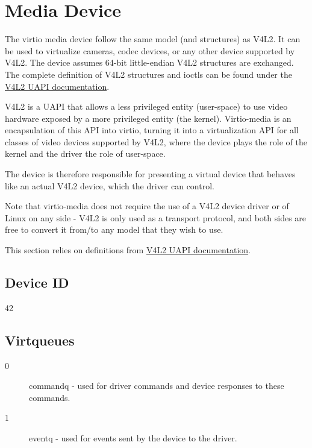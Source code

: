 \section{Media Device}\label{sec:Device Types / Media Device}

The virtio media device follow the same model (and structures) as V4L2. It
can be used to virtualize cameras, codec devices, or any other device
supported by V4L2. The device assumes 64-bit little-endian V4L2 structures
are exchanged. The complete definition of V4L2 structures and ioctls can
be found under the
\href{https://www.kernel.org/doc/html/latest/userspace-api/media/index.html}{V4L2 UAPI documentation}.

V4L2 is a UAPI that allows a less privileged entity (user-space) to use video
hardware exposed by a more privileged entity (the kernel). Virtio-media is an
encapsulation of this API into virtio, turning it into a virtualization API
for all classes of video devices supported by V4L2, where the device plays the
role of the kernel and the driver the role of user-space.

The device is therefore responsible for presenting a virtual device that behaves
like an actual V4L2 device, which the driver can control.

Note that virtio-media does not require the use of a V4L2 device driver or of
Linux on any side - V4L2 is only used as a transport protocol,
and both sides are free to convert it from/to any model that they wish to use.

This section relies on definitions from
\href{https://www.kernel.org/doc/html/latest/userspace-api/media/index.html}{V4L2 UAPI documentation}.

\subsection{Device ID}\label{sec:Device Types / Media Device / Device ID}

42

\subsection{Virtqueues}\label{sec:Device Types / Media Device / Virtqueues}

\begin{description}
\item[0] commandq - used for driver commands and device responses to these
commands.
\item[1] eventq - used for events sent by the device to the driver.
\end{description}


